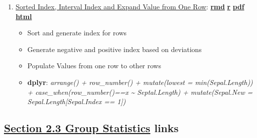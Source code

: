 \documentclass[
]{book}
\providecommand{\tightlist}{%
  \setlength{\itemsep}{0pt}\setlength{\parskip}{0pt}}
\begin{document}
\begin{enumerate}
\def\labelenumi{\arabic{enumi}.}
\tightlist
\item
  \href{https://fanwangecon.github.io/R4Econ/summarize/index/htmlpdfr/fs_index_populate.html}{Sorted Index, Interval Index and Expand Value from One Row}: \href{https://github.com/FanWangEcon/R4Econ/blob/master/summarize/index//fs_index_populate.Rmd}{\textbf{rmd}} \textbar{} \href{https://github.com/FanWangEcon/R4Econ/blob/master/summarize/index/htmlpdfr/fs_index_populate.R}{\textbf{r}} \textbar{} \href{https://github.com/FanWangEcon/R4Econ/blob/master/summarize/index/htmlpdfr/fs_index_populate.pdf}{\textbf{pdf}} \textbar{} \href{https://fanwangecon.github.io/R4Econ/summarize/index/htmlpdfr/fs_index_populate.html}{\textbf{html}}

  \begin{itemize}
  \tightlist
  \item
    Sort and generate index for rows
  \item
    Generate negative and positive index based on deviations
  \item
    Populate Values from one row to other rows
  \item
    \textbf{dplyr}: \emph{arrange() + row\_number() + mutate(lowest = min(Sepal.Length)) + case\_when(row\_number()==x \textasciitilde{} Septal.Length) + mutate(Sepal.New = Sepal.Length{[}Sepal.Index == 1{]})}
  \end{itemize}
\end{enumerate}

\hypertarget{section-2.3-group-statisticsgroup-statistics-links}{%
\subsection{\texorpdfstring{\protect\hyperlink{group-statistics}{Section 2.3 Group Statistics} links}{Section 2.3 Group Statistics links}}\label{section-2.3-group-statisticsgroup-statistics-links}}
\end{document}
